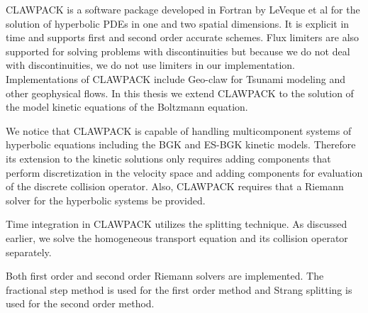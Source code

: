 CLAWPACK is a software package developed in Fortran by LeVeque et al \cite{clawly} for the solution of hyperbolic PDEs in one and two spatial dimensions. It is explicit in time and supports first and second order accurate schemes. Flux limiters are also supported for solving problems with discontinuities but because we do not deal with discontinuities, we do not use limiters in our implementation. Implementations of CLAWPACK include Geo-claw for Tsunami modeling and other geophysical flows. In this thesis we extend CLAWPACK to the solution of the model kinetic equations of the Boltzmann equation.

We notice that CLAWPACK is capable of handling multicomponent systems of hyperbolic equations including the BGK and ES-BGK kinetic models. Therefore its extension to the kinetic solutions only requires adding components that perform discretization in the velocity space and adding components for evaluation of the discrete collision operator. Also, CLAWPACK requires that a Riemann solver for the hyperbolic systems be provided.

Time integration in CLAWPACK utilizes the splitting technique. As discussed earlier, we solve the homogeneous transport equation and its collision operator separately.

Both first order and second order Riemann solvers are implemented. The fractional step method is used for the first order method and Strang splitting is used for the second order method.
